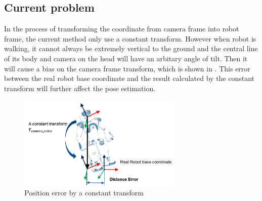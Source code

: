 \subsection{Current problem}
In the process of transforming the coordinate from camera frame into robot frame, the current method only use a constant transform. However when robot is walking, it cannot always be extremely vertical to the ground and the central line of its body and camera on the head will have an arbitary angle of tilt. Then it will cause a bias on the camera frame transform, which is shown in . This error between the real robot base coordinate and the result calculated by the constant transform will further affect the pose estimation. 
\begin{figure}[!htb]
    \includegraphics[width=0.7\textwidth]{pics/error.png}
    \centering
    \caption{Position error by a constant transform}
    \label{fig: error}
\end{figure}\\

